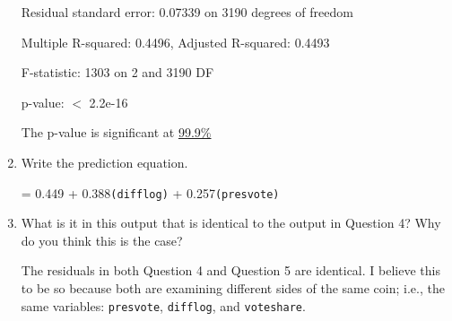 \documentclass[12pt,letterpaper]{article}
\begin{document}
\begin{enumerate}
	Residual standard error: 0.07339 on 3190 degrees of freedom
	
	Multiple R-squared: 0.4496, Adjusted R-squared: 0.4493
	
	F-statistic: 1303 on 2 and 3190 DF
	
	p-value: $<$ 2.2e-16
	
	The p-value is significant at \underline{99.9\%}
	\vspace{0.5cm}
	
	\item Write the prediction equation.	
	
	\-\hspace{0.5cm} = 0.449 + 0.388\texttt{(difflog)} + 0.257\texttt{(presvote)}
	
	\item What is it in this output that is identical to the output in Question 4? Why do you think this is the case?
	
	\vspace{0.5cm}
	The residuals in both Question 4 and Question 5 are identical. I believe this to be so because both are examining different sides of the same coin; i.e., the same variables: \texttt{presvote}, \texttt{difflog}, and \texttt{voteshare}.
		
	\end{enumerate}
	
	
	
	
\end{document}
